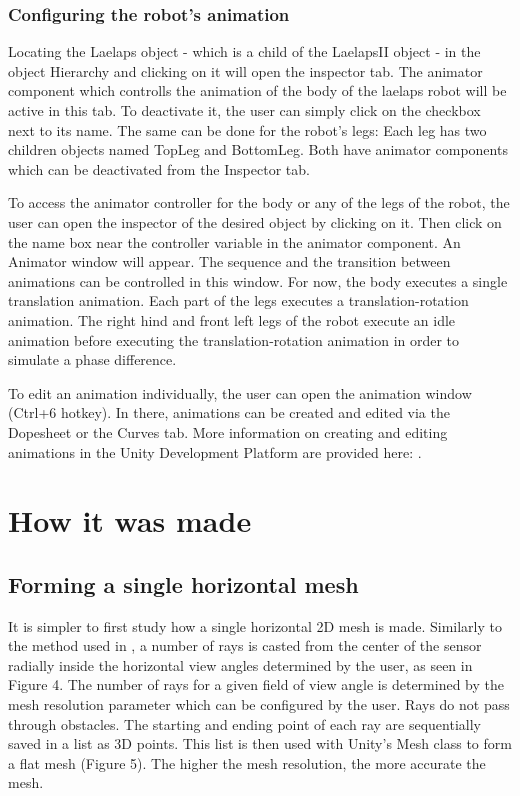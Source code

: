 \documentclass{article}
\begin{document}
\subsubsection{Configuring the robot's animation}

Locating the Laelaps object - which is a child of the LaelapsII object - in the object Hierarchy and clicking on it will open the inspector tab. The animator component which controlls the animation of the body of the laelaps robot will be active in this tab. To deactivate it, the user can simply click on the checkbox next to its name. The same can be done for the robot's legs: Each leg has two children objects named TopLeg and BottomLeg. Both have animator components which can be deactivated from the Inspector tab.

To access the animator controller for the body or any of the legs of the robot, the user can open the inspector of the desired object by clicking on it. Then click on the name box near the controller variable in the animator component. An Animator window will appear. The sequence and the transition between animations can be controlled in this window. For now, the body executes a single translation animation. Each part of the legs executes a translation-rotation animation. The right hind and front left legs of the robot execute an idle animation before executing the translation-rotation animation in order to simulate a phase difference. 

To edit an animation individually, the user can open the animation window (Ctrl+6 hotkey). In there, animations can be created and edited via the Dopesheet or the Curves tab. More information on creating and editing animations in the Unity Development Platform are provided here: \cite{jonas_tyroller_how_2019} \cite{noauthor_learn_nodate}.

\section{How it was made}

\subsection{Forming a single horizontal mesh}
    
    It is simpler to first study how a single horizontal 2D mesh is made. Similarly to the method used in \cite{sebastian_lague_field_2015}, a number of rays is casted from the center of the sensor radially inside the horizontal view angles determined by the user, as seen in Figure 4. The number of rays for a given field of view angle is determined by the mesh resolution parameter which can be configured by the user. Rays do not pass through obstacles. The starting and ending point of each ray are sequentially saved in a list as 3D points. This list is then used with Unity's Mesh class to form a flat mesh (Figure 5). The higher the mesh resolution, the more accurate the mesh. 
    
\end{document}
